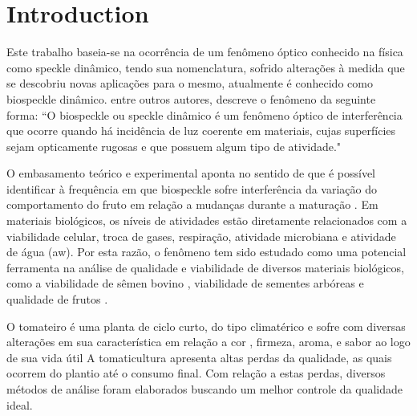 \documentclass[journal,article,submit,moreauthors,pdftex,10pt,a4paper]{mdpi}
\theoremstyle{mdpi}
\newcounter{ex}
\newcounter{re}
\theoremstyle{mdpidefinition}
\begin{document}



\section{Introduction}
Este trabalho baseia-se na ocorrência de um fenômeno óptico conhecido na física como speckle dinâmico, tendo sua nomenclatura, sofrido alterações à medida que se descobriu novas aplicações para o mesmo, atualmente é conhecido como biospeckle dinâmico. \citep{Rodrigues2007} entre outros autores, descreve o fenômeno da seguinte forma:
“O biospeckle ou speckle dinâmico é um fenômeno óptico de interferência que ocorre quando há incidência de luz coerente em materiais, cujas superfícies sejam opticamente rugosas e que possuem algum tipo de atividade."

O embasamento teórico e experimental aponta no sentido de que é possível identificar à frequência em que biospeckle sofre interferência da variação do comportamento do fruto em relação a mudanças durante a maturação \cite{Zdunek2014}. Em materiais biológicos, os níveis de atividades estão diretamente relacionados com a viabilidade celular, troca de gases, respiração, atividade microbiana e atividade de água (aw). 
 Por esta razão, o fenômeno tem sido estudado como uma potencial ferramenta na análise de qualidade e viabilidade de diversos materiais biológicos, como a viabilidade de sêmen bovino \cite{Henrique2007a}, viabilidade de sementes arbóreas \citep{Aparecida2011} e qualidade de frutos \citep{Cotching2018}.

O tomateiro é uma planta de ciclo curto, do tipo climatérico e sofre com diversas alterações em sua característica em relação a cor \citep{santana2017infodengue}, firmeza, aroma, e sabor \citep{CarmeloLuisGustavoPaulino;FerreiraMarcosDavid;GimenezCalbo2015} ao logo de sua vida útil 
A tomaticultura apresenta altas perdas da qualidade, as quais ocorrem do plantio até o consumo final. Com relação a estas perdas, diversos métodos de análise foram elaborados buscando um melhor controle da qualidade ideal. 
\end{document}
